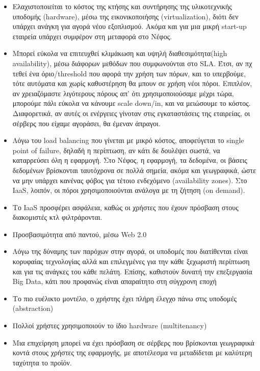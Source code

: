 \documentclass{article}
\begin{document}
\begin{itemize}
\item Eλαχιστοποιείται το κόστος της κτήσης και συντήρησης της
υλικοτεχνικής υποδομής
(hardware), μέσω της
εικονικοποιήσης (virtualization),
διότι δεν υπάρχει ανάγκη για αγορά νέου εξοπλισμού.
Ακόμα και για μια μικρή
start-up εταιρεία υπάρχει
συμφέρον στη μεταφορά στο Νέφος.
\item Μπορεί εύκολα να επιτευχθεί κλιμάκωση και υψηλή
διαθεσιμότητα(high availability),
μέσω διάφορων μεθόδων που συμφωνούνται
στο SLA. Έτσι, αν πχ τεθεί
ένα όριο/threshold που αφορά την χρήση των πόρων, και το υπερβούμε, τότε
αυτόματα και χωρίς καθυστέρηση θα μπουν σε χρήση νέοι πόροι. Επιπλέον, αν
χρειαζόμαστε λιγότερους πόρους  απ’ ότι χρησιμοποιούσαμε μέχρι τώρα,
μπορούμε πάλι εύκολα να κάνουμε scale down/in,
και να μειώσουμε το κόστος. Διαφορετικά, αν αυτές οι
ενέργειες γίνοταν στις εγκαταστάσεις της εταιρείας, οι σέρβερς που είχαμε
αγοράσει, θα έμεναν άπραγοι.
\item Λόγω του load balancing
που γίνεται με μικρό κόστος, αποφεύγεται το
single point of failure,
δηλαδή η περίπτωση, αν κάτι δε δουλέψει σωστά, να καταρρεύσει όλη η
εφαρμογή. Στο Νέφος, η εφαρμογή, τα δεδομένα, οι βάσεις δεδομένων
βρίσκονται ταυτόχρονα σε πολλά σημεία, ακόμα και γεωγραφικά, ώστε να μην
υπάρχει κανένας φόβος για τέτοιο ενδεχόμενο
(availability zones).
Στο IaaS, λοιπόν, οι πόροι
χρησιμοποιούνται ανάλογα με τη ζήτηση (on
demand).
\item Το IaaS προσφέρει
ασφάλεια, καθώς οι χρήστες που έχουν πρόσβαση στους διακομιστές κτλ
φιλτράρονται.
\item Προσβασιμότητα από παντού, μέσω Web
2.0
\item Λόγω της δύναμης των παρόχων στην αγορά, οι υποδομές που διατίθενται
είναι κορυφαίας τεχνολογίας αλλά και επιλεγμένες για την κάθε ξεχωριστή
περίπτωση και για τις ανάγκες του κάθε πελάτη. Επίσης, καθιστούν δυνατή
την επεξεργασία Big Data,
κάτι που προφανώς είναι απαραίτητο στη σύγχρονη
εποχή
\item Το πιο ευέλικτο μοντέλο, ο χρήστης έχει πλήρη έλεγχο πάνω στις
υποδομές (abstraction)
\item Πολλοί χρήστες χρησιμοποιούν το ίδιο
hardware (multitenancy)
\item Μια επιχείρηση μπορεί να έχει πρόσβαση σε σέρβερς που βρίσκονται
γεωγραφικά κοντά στους χρήστες της εφαρμογής, με αποτέλεσμα να μεταδίδεται
με καλύτερη ταχύτητα το προϊόν.
\end{itemize}
\end{document}
